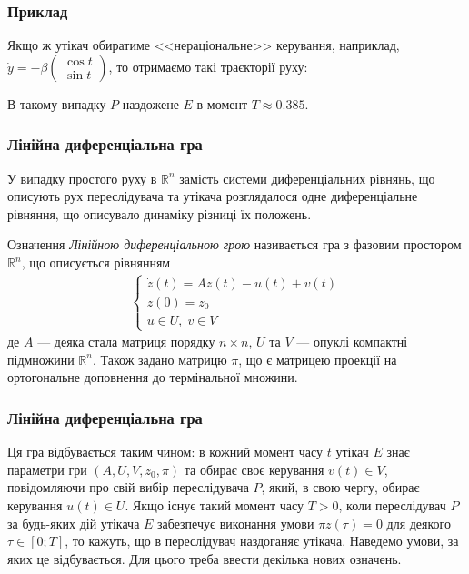 \documentclass[10pt,pdf,aspectratio=169]{beamer}
\newcommand{\R}{\mathbb{R}}
\renewcommand{\d}[1]{\dot{#1}}
\renewcommand{\l}{\left}
\renewcommand{\r}{\right}
\begin{document}
    \begin{frame}
        \frametitle{Приклад}
        Якщо ж утікач обиратиме <<нераціональне>> керування, наприклад, $\d{y} = -\beta\begin{pmatrix}
            \cos t \\ \sin t
        \end{pmatrix}$, то отримаємо такі траєкторії руху:
        \begin{center}
            \resizebox{180pt}{!}{
                
            }
        \end{center}
        В такому випадку $P$ наздожене $E$ в момент $T \approx 0.385$.
    \end{frame}
    \begin{frame}
        \frametitle{Лінійна диференціальна гра}
        У випадку простого руху в $\R^n$ замість системи диференціальних рівнянь,
        що описують рух переслідувача та утікача розглядалося
        одне диференціальне рівняння, що описувало динаміку різниці їх положень.
        \begin{block}{Означення}
            \emph{Лінійною диференціальною грою} називається гра з фазовим простором
            $\R^n$, що описується рівнянням
            \begin{gather*}
                \begin{cases}
                    \d{z}(t) = A z(t) - u(t) + v(t) \\
                    z(0) = z_0 \\
                    u \in U, \; v \in V
                \end{cases}
            \end{gather*}
            де $A$ --- деяка стала матриця порядку $n\times n$, $U$ та $V$ --- опуклі компактні
            підмножини $\R^n$. Також задано матрицю $\pi$, що є матрицею проекції на ортогональне доповнення до термінальної множини.
        \end{block}
    \end{frame}
    \begin{frame}
        \frametitle{Лінійна диференціальна гра}
    
        Ця гра відбувається таким чином: в кожний момент часу $t$ утікач $E$ знає параметри гри
        $\l(A, U, V, z_0, \pi \r)$ та обирає своє керування $v(t) \in V$, повідомляючи про свій вибір
        переслідувача $P$, який, в свою чергу, обирає керування $u(t) \in U$.
        Якщо існує такий момент часу $T > 0$, коли переслідувач $P$ за будь-яких дій
        утікача $E$ забезпечує виконання умови $\pi z(\tau) = 0$ для деякого
        $\tau \in [0; T]$, то кажуть, що в переслідувач наздоганяє утікача.
        Наведемо умови, за яких це відбувається. Для цього треба ввести декілька нових означень.
    
    \end{frame}
\end{document}
